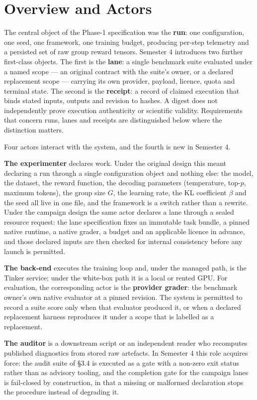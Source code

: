 \documentclass[12pt,a4paper]{report}
\begin{document}
\section{Overview and Actors}\label{overview-and-actors}

The central object of the Phase-1 specification was the \textbf{run}:
one configuration, one seed, one framework, one training budget,
producing per-step telemetry and a persisted set of raw group reward
tensors. Semester 4 introduces two further first-class objects. The
first is the \textbf{lane}: a single benchmark suite evaluated under a
named scope --- an original contract with the suite's owner, or a
declared replacement scope --- carrying its own provider, payload,
licence, quota and terminal state. The second is the \textbf{receipt}: a
record of claimed execution that binds stated inputs, outputs and
revision to hashes. A digest does not independently prove execution
authenticity or scientific validity. Requirements that concern runs,
lanes and receipts are distinguished below where the distinction
matters.

Four actors interact with the system, and the fourth is new in Semester
4.

\textbf{The experimenter} declares work. Under the original design this
meant declaring a run through a single configuration object and nothing
else: the model, the dataset, the reward function, the decoding
parameters (temperature, top-\(p\), maximum tokens), the group size
\(G\), the learning rate, the KL coefficient \(\beta\) and the seed all
live in one file, and the framework is a switch rather than a rewrite.
Under the campaign design the same actor declares a lane through a
sealed resource request: the lane specification fixes an immutable task
bundle, a pinned native runtime, a native grader, a budget and an
applicable licence in advance, and those declared inputs are then
checked for internal consistency before any launch is permitted.

\textbf{The back-end} executes the training loop and, under the managed
path, is the Tinker service; under the white-box path it is a local or
rented GPU. For evaluation, the corresponding actor is the
\textbf{provider grader}: the benchmark owner's own native evaluator at
a pinned revision. The system is permitted to record a suite score only
when that evaluator produced it, or when a declared replacement harness
reproduces it under a scope that is labelled as a replacement.

\textbf{The auditor} is a downstream script or an independent reader who
recomputes published diagnostics from stored raw artefacts. In Semester
4 this role acquires force: the audit suite of §3.4 is executed as a
gate with a non-zero exit status rather than as advisory tooling, and
the completion gate for the campaign lanes is fail-closed by
construction, in that a missing or malformed declaration stops the
procedure instead of degrading it.
\end{document}

